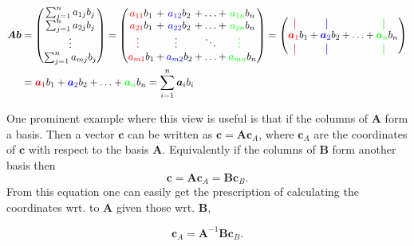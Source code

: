 \newcommand{\red}[1]{{\color{red} #1}}
\newcommand{\blue}[1]{{\color{blue} #1}}
\newcommand{\green}[1]{{\color{green} #1}}

\begin{align}
\bm{Ab} &= \begin{pmatrix}
    \sum_{j=1}^n a_{1j}b_j\\
    \sum_{j=1}^n a_{2j}b_j\\
    \vdots \\
    \sum_{j=1}^n a_{mj}b_j\\
\end{pmatrix} = 
{\setlength\arraycolsep{1pt}
\begin{pmatrix}
    \red{a_{11}} b_1 &+& \blue{a_{12}} b_2 &+&\hdots &+& \green{a_{1n}} b_n \\
    \red{a_{21}} b_1 &+& \blue{a_{22}} b_2 &+&\hdots &+& \green{a_{2n}} b_n \\
    \red{\vdots} \ \ & & \blue{\vdots} \ \ & &\ddots & & \green{\vdots} \ \ \\
    \red{a_{m1}} b_1 &+& \blue{a_{m2}} b_2 &+&\hdots &+& \green{a_{mn}} b_n \\
\end{pmatrix}} = 
{\setlength\arraycolsep{1pt}
\begin{pmatrix}
\red{\vertbar} \ \ & & \blue{\vertbar} \ \ & &        & & \green{\vertbar} \ \ \\
\red{\bm{a}_1} b_1 &+& \blue{\bm{a}_2} b_2 &+& \hdots &+& \green{\bm{a}_n} b_n \\
\red{\vertbar} \ \ & & \blue{\vertbar} \ \ & &        & & \green{\vertbar} \ \
\end{pmatrix}}  \\
&=\red{\bm{a}_1} b_1 +  \blue{\bm{a}_2} b_2 + \hdots + \green{\bm{a}_n} b_n = \sum_{i=1}^n \bm{a}_i b_i
\end{align}

One prominent example where this view is useful is that if the columns of $\bm{A}$ form a basis.
Then a vector $\bm{c}$ can be written as $\bm{c} = \bm{A}\bm{c}_A$, where 
$\bm{c}_A$ are the coordinates of $\bm{c}$ with respect to the basis $\bm{A}$.
Equivalently if the columns of $\bm{B}$ form another basis then
\begin{equation}
    \bm{c} = \bm{A}\bm{c}_A = \bm{B}\bm{c}_B.
\end{equation}
From this equation one can easily get the prescription of calculating
the coordinates wrt. to $\bm{A}$ given those wrt. $\bm{B}$,

\begin{equation}
    \bm{c}_A = \bm{A}^{-1} \bm{B}\bm{c}_B.
\end{equation}

